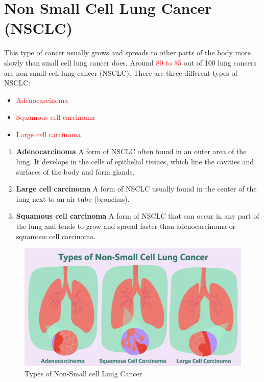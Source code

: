 \section{Non Small Cell Lung Cancer (NSCLC)} 
This type of cancer usually grows and spreads to other parts of the body more slowly than small cell lung cancer does. Around \textcolor{red}{80 to 85} out of 100 lung cancers are non small cell lung cancer (NSCLC). There are three different types of NSCLC:
\begin{outline}
\begin{itemize}
    \item \textcolor{red}{Adenocarcinoma}
    \item \textcolor{red}{Squamous cell carcinoma}
    \item \textcolor{red}{Large cell carcinoma}
\end{itemize}
\end{outline}

\begin{highlight}
\begin{enumerate}
    \item \textbf{Adenocarcinoma} A form of NSCLC often found in an outer area of the lung. It develops in the cells of epithelial tissues, which line the cavities and surfaces of the body and form glands.

    \item \textbf{Large cell carcinoma} A form of NSCLC usually found in the center of the lung next to an air tube (bronchus).

    \item \textbf{Squamous cell carcinoma} A form of NSCLC that can occur in any part of the lung and tends to grow and spread faster than adenocarcinoma or squamous cell carcinoma.
\end{enumerate}
\end{highlight}


\begin{figure}[ht!]
    \centering
    \includegraphics[width=\linewidth]{images/Non_small_cell_lung_cancer.png}
    \caption{Types of Non-Small cell Lung Cancer}
\end{figure}

